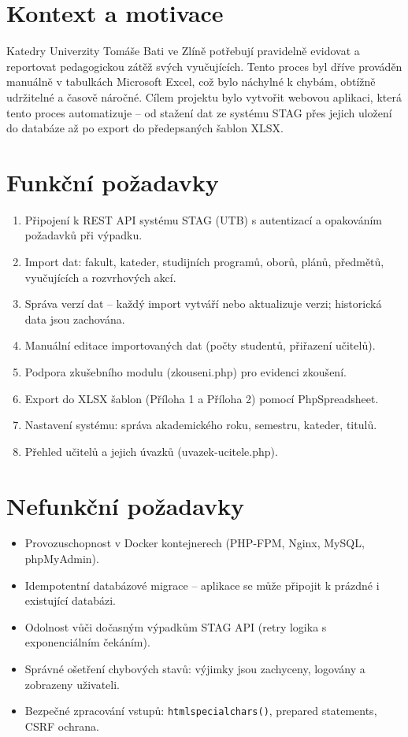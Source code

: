 \documentclass[12pt,a4paper]{report}
\begin{document}
\section{Kontext a motivace}

Katedry Univerzity Tomáše Bati ve Zlíně potřebují pravidelně evidovat a reportovat pedagogickou zátěž svých vyučujících. Tento proces byl dříve prováděn manuálně v tabulkách Microsoft Excel, což bylo náchylné k chybám, obtížně udržitelné a časově náročné. Cílem projektu bylo vytvořit webovou aplikaci, která tento proces automatizuje -- od stažení dat ze systému STAG přes jejich uložení do databáze až po export do předepsaných šablon XLSX.

\section{Funkční požadavky}

\begin{enumerate}
  \item Připojení k REST API systému STAG (UTB) s autentizací a opakováním požadavků při výpadku.
  \item Import dat: fakult, kateder, studijních programů, oborů, plánů, předmětů, vyučujících a rozvrhových akcí.
  \item Správa verzí dat -- každý import vytváří nebo aktualizuje verzi; historická data jsou zachována.
  \item Manuální editace importovaných dat (počty studentů, přiřazení učitelů).
  \item Podpora zkušebního modulu (zkouseni.php) pro evidenci zkoušení.
  \item Export do XLSX šablon (Příloha 1 a Příloha 2) pomocí PhpSpreadsheet.
  \item Nastavení systému: správa akademického roku, semestru, kateder, titulů.
  \item Přehled učitelů a jejich úvazků (uvazek-ucitele.php).
\end{enumerate}

\section{Nefunkční požadavky}

\begin{itemize}
  \item Provozuschopnost v Docker kontejnerech (PHP-FPM, Nginx, MySQL, phpMyAdmin).
  \item Idempotentní databázové migrace -- aplikace se může připojit k prázdné i existující databázi.
  \item Odolnost vůči dočasným výpadkům STAG API (retry logika s exponenciálním čekáním).
  \item Správné ošetření chybových stavů: výjimky jsou zachyceny, logovány a zobrazeny uživateli.
  \item Bezpečné zpracování vstupů: \texttt{htmlspecialchars()}, prepared statements, CSRF ochrana.
\end{itemize}
\end{document}
